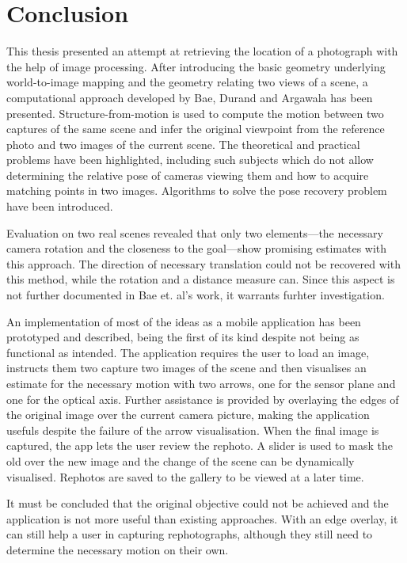 \chapter{Conclusion}

This thesis presented an attempt at retrieving the location of a photograph with
the help of image processing. After introducing the basic geometry underlying
world-to-image mapping and the geometry relating two views of a scene, a
computational approach developed by Bae, Durand and Argawala has been presented.
Structure-from-motion is used to compute the motion between two captures of the
same scene and infer the original viewpoint from the reference photo and two
images of the current scene.  The theoretical and practical problems have been
highlighted, including such subjects which do not allow determining the relative
pose of cameras viewing them and how to acquire matching points in two images.
Algorithms to solve the pose recovery problem have been introduced.

Evaluation on two real scenes revealed that only two elements---the necessary
camera rotation and the closeness to the goal---show promising estimates with
this approach. The direction of necessary translation could not be recovered
with this method, while the rotation and a distance measure can.  Since this
aspect is not further documented in Bae et. al's work, it warrants furhter
investigation.

An implementation of most of the ideas as a mobile application has been
prototyped and described, being the first of its kind despite not being as
functional as intended. The application requires the user to load an image,
instructs them two capture two images of the scene and then visualises an
estimate for the necessary motion with two arrows, one for the sensor plane and
one for the optical axis. Further assistance is provided by overlaying the edges
of the original image over the current camera picture, making the application
usefuls despite the failure of the arrow visualisation.  When the final image is
captured, the app lets the user review the rephoto. A slider is used to mask the
old over the new image and the change of the scene can be dynamically
visualised. Rephotos are saved to the gallery to be viewed at a later time.

It must be concluded that the original objective could not be achieved and
the application is not more useful than existing approaches. With an edge
overlay, it can still help a user in capturing rephotographs, although they
still need to determine the necessary motion on their own.
